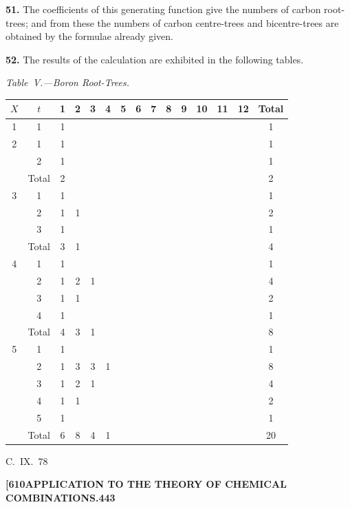 \documentclass[11pt,a4paper]{book}
\begin{document}
{\medskip
\noindent\textbf{51.}
The coefficients of this generating function give the numbers of carbon root-trees; and from these the numbers of carbon centre-trees and bicentre-trees are obtained by the formulae already given.

\medskip
\noindent\textbf{52.}
The results of the calculation are exhibited in the following tables.

\medskip
\noindent\textit{Table~V.---Boron Root-Trees.}

\begin{center}
\small
\begin{longtable}{|c|c|c|c|c|c|c|c|c|c|c|c|c|c|c|}
\hline
$X$ & $t$ & 1 & 2 & 3 & 4 & 5 & 6 & 7 & 8 & 9 & 10 & 11 & 12 & Total \\
\hline
\endfirsthead
1 & 1 & 1 & & & & & & & & & & & & 1 \\
\hline
2 & 1 & 1 & & & & & & & & & & & & 1 \\
  & 2 & 1 & & & & & & & & & & & & 1 \\
  & Total & 2 & & & & & & & & & & & & 2 \\
\hline
3 & 1 & 1 & & & & & & & & & & & & 1 \\
  & 2 & 1 & 1 & & & & & & & & & & & 2 \\
  & 3 & 1 & & & & & & & & & & & & 1 \\
  & Total & 3 & 1 & & & & & & & & & & & 4 \\
\hline
4 & 1 & 1 & & & & & & & & & & & & 1 \\
  & 2 & 1 & 2 & 1 & & & & & & & & & & 4 \\
  & 3 & 1 & 1 & & & & & & & & & & & 2 \\
  & 4 & 1 & & & & & & & & & & & & 1 \\
  & Total & 4 & 3 & 1 & & & & & & & & & & 8 \\
\hline
5 & 1 & 1 & & & & & & & & & & & & 1 \\
  & 2 & 1 & 3 & 3 & 1 & & & & & & & & & 8 \\
  & 3 & 1 & 2 & 1 & & & & & & & & & & 4 \\
  & 4 & 1 & 1 & & & & & & & & & & & 2 \\
  & 5 & 1 & & & & & & & & & & & & 1 \\
  & Total & 6 & 8 & 4 & 1 & & & & & & & & & 20 \\
\hline
\end{longtable}
\end{center}
\hfill C.~IX.\ 78

\newpage
\noindent\textbf{[610}\hspace{\fill}\textbf{APPLICATION TO THE THEORY OF CHEMICAL COMBINATIONS.}\hspace{\fill}\textbf{443}

}
\end{document}
